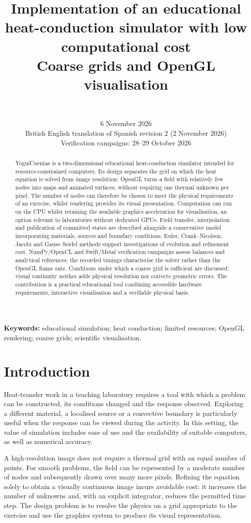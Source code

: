 \documentclass[11pt,a4paper]{article}
\title{Implementation of an educational heat-conduction simulator with low computational cost\\[2mm]\large Coarse grids and OpenGL visualisation}
\author{\autores\\[2mm]\small\afiliacion}
\date{6 November 2026\\\small British English translation of Spanish revision 2 (2 November 2026)\\\small Verification campaigns: 28--29 October 2026}
\begin{document}
\maketitle
\begin{abstract}
YoguiCuentas is a two-dimensional educational heat-conduction simulator intended for resource-constrained computers. Its design separates the grid on which the heat equation is solved from image resolution: OpenGL turns a field with relatively few nodes into maps and animated surfaces, without requiring one thermal unknown per pixel. The number of nodes can therefore be chosen to meet the physical requirements of an exercise, whilst rendering provides its visual presentation. Computation can run on the CPU whilst retaining the available graphics acceleration for visualisation, an option relevant to laboratories without dedicated GPUs. Field transfer, interpolation and publication of committed states are described alongside a conservative model incorporating materials, sources and boundary conditions. Euler, Crank--Nicolson, Jacobi and Gauss--Seidel methods support investigations of evolution and refinement cost. NumPy/OpenCL and Swift/Metal verification campaigns assess balances and analytical references; the recorded timings characterise the solver rather than the OpenGL frame rate. Conditions under which a coarse grid is sufficient are discussed: visual continuity neither adds physical resolution nor corrects geometric errors. The contribution is a practical educational tool combining accessible hardware requirements, interactive visualisation and a verifiable physical basis.
\end{abstract}
\noindent\textbf{Keywords:} educational simulation; heat conduction; limited resources; OpenGL rendering; coarse grids; scientific visualisation.




\section{Introduction}
Heat-transfer work in a teaching laboratory requires a tool with which a problem can be constructed, its conditions changed and the response observed. Exploring a different material, a localised source or a convective boundary is particularly useful when the response can be viewed during the activity. In this setting, the value of simulation includes ease of use and the availability of suitable computers, as well as numerical accuracy.

A high-resolution image does not require a thermal grid with an equal number of points. For smooth problems, the field can be represented by a moderate number of nodes and subsequently drawn over many more pixels. Refining the equation solely to obtain a visually continuous image incurs avoidable cost: it increases the number of unknowns and, with an explicit integrator, reduces the permitted time step. The design problem is to resolve the physics on a grid appropriate to the exercise and use the graphics system to produce its visual representation.
\end{document}

